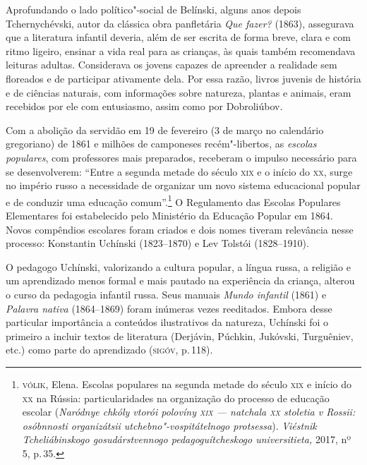Aprofundando o lado político"-social de Belínski, alguns anos depois
Tchernychévski, autor da clássica obra panfletária \emph{Que fazer?}
(1863), assegurava que a literatura infantil deveria, além de ser
escrita de forma breve, clara e com ritmo ligeiro, ensinar a vida real
para as crianças, às quais também recomendava leituras adultas.
Considerava os jovens capazes de apreender a realidade sem floreados e
de participar ativamente dela. Por essa razão, livros juvenis de
história e de ciências naturais, com informações sobre natureza, plantas
e animais, eram recebidos por ele com entusiasmo, assim como por
Dobroliúbov.

Com a abolição da servidão em 19 de fevereiro (3 de março no calendário
gregoriano) de 1861 e milhões de camponeses recém"-libertos, as
\emph{escolas} \emph{populares}, com professores mais preparados,
receberam o impulso necessário para se desenvolverem: ``Entre a segunda
metade do século \textsc{xix} e o início do \textsc{xx}, surge no império russo a
necessidade de organizar um novo sistema educacional popular e de
conduzir uma educação comum''.\footnote{\textsc{vólik}, Elena. Escolas populares
  na segunda metade do século \textsc{xix} e início do \textsc{xx} na Rússia:
  particularidades na organização do processo de educação escolar
  (\emph{Naródnye chkóly vtorói polovíny \textsc{xix} --- natchala \textsc{xx} stoletia v
  Rossii: osóbnnosti organizátsii utchebno"-vospitátelnogo protsessa}).
  \emph{Viéstnik Tcheliábinskogo gosudárstvennogo pedagoguítcheskogo
  universitieta,} 2017, nº 5, p.\,35.} O Regulamento das Escolas Populares
Elementares foi estabelecido pelo Ministério da Educação Popular em
1864. Novos compêndios escolares foram criados e dois nomes tiveram
relevância nesse processo: Konstantin Uchínski (1823--1870) e Lev
Tolstói (1828--1910).

O pedagogo Uchínski, valorizando a cultura popular, a língua russa, a
religião e um aprendizado menos formal e mais pautado na experiência da
criança, alterou o curso da pedagogia infantil russa. Seus manuais
\emph{Mundo infantil} (1861) e \emph{Palavra nativa} (1864--1869) foram
inúmeras vezes reeditados. Embora desse particular importância a
conteúdos ilustrativos da natureza, Uchínski foi o primeiro a incluir
textos de literatura (Derjávin, Púchkin, Jukóvski, Turguêniev, etc.)
como parte do aprendizado (\textsc{sigóv}, p.\,118).

